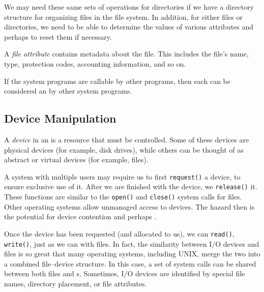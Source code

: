 We may need these same sets of operations for directories if we have a directory structure for organizing files in the file system.
In addition, for either files or directories, we need to be able to determine the values of various attributes and perhaps to reset them if necessary.

\begin{definition}\label{def:File_Attribute}
  A \emph{file attribute} contains metadata about the file.
  This includes the file's name, type, protection codes, accounting information, and so on.
\end{definition}

\begin{remark*}
  If the system programs are callable by other programs, then each can be considered an  by other system programs.
\end{remark*}

\subsection{Device Manipulation}\label{subsec:Device_Manipulation}
\begin{definition}[Device]\label{def:Device}
  A \emph{device} in an  is a resource that must be controlled.
  Some of these devices are physical devices (for example, disk drives), while others can be thought of as abstract or virtual devices (for example, files).
\end{definition}

A system with multiple users may require us to first \texttt{request()} a device, to ensure exclusive use of it.
After we are finished with the device, we \texttt{release()} it.
These functions are similar to the \texttt{open()} and \texttt{close()} system calls for files.
Other operating systems allow unmanaged access to devices.
The hazard then is the potential for device contention and perhaps .

Once the device has been requested (and allocated to us), we can \texttt{read()}, \texttt{write()}, just as we can with files.
In fact, the similarity between I/O devices and files is so great that many operating systems, including UNIX, merge the two into a combined file–device structure.
In this case, a set of system calls can be shared between both files and s.
Sometimes, I/O devices are identified by special file names, directory placement, or file attributes.

